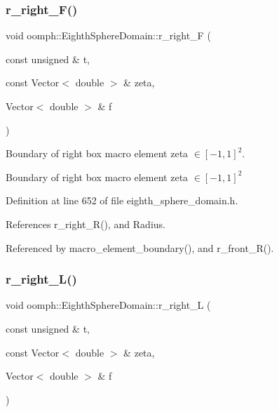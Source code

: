 \subsubsection{\texorpdfstring{r\+\_\+right\+\_\+\+F()}{r\_right\_F()}}
{\footnotesize\ttfamily void oomph\+::\+Eighth\+Sphere\+Domain\+::r\+\_\+right\+\_\+F (\begin{DoxyParamCaption}\item[{const unsigned \&}]{t,  }\item[{const Vector$<$ double $>$ \&}]{zeta,  }\item[{Vector$<$ double $>$ \&}]{f }\end{DoxyParamCaption})\hspace{0.3cm}{\ttfamily [private]}}



Boundary of right box macro element zeta $ \in [-1,1]^2 $. 

Boundary of right box macro element zeta $ \in [-1,1]^2 $ 

Definition at line 652 of file eighth\+\_\+sphere\+\_\+domain.\+h.



References r\+\_\+right\+\_\+\+R(), and Radius.



Referenced by macro\+\_\+element\+\_\+boundary(), and r\+\_\+front\+\_\+\+R().

\mbox{\label{classoomph_1_1EighthSphereDomain_ad029a857dd1b83ed10281613e0c56800}} 
\subsubsection{\texorpdfstring{r\+\_\+right\+\_\+\+L()}{r\_right\_L()}}
{\footnotesize\ttfamily void oomph\+::\+Eighth\+Sphere\+Domain\+::r\+\_\+right\+\_\+L (\begin{DoxyParamCaption}\item[{const unsigned \&}]{t,  }\item[{const Vector$<$ double $>$ \&}]{zeta,  }\item[{Vector$<$ double $>$ \&}]{f }\end{DoxyParamCaption})\hspace{0.3cm}{\ttfamily [private]}}



